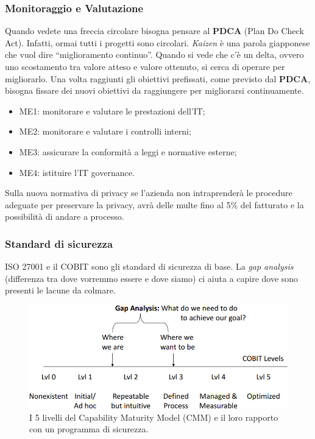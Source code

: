 \subsubsection{Monitoraggio e Valutazione}
Quando vedete una freccia circolare bisogna pensare al \textbf{PDCA} (Plan Do
Check Act). Infatti, ormai tutti i progetti sono circolari. \emph{Kaizen} è
una parola giapponese che vuol dire “miglioramento continuo”. Quando si vede
che c’è un delta, ovvero uno scostamento tra valore atteso e valore ottenuto,
si cerca di operare per migliorarlo. Una volta raggiunti gli obiettivi
prefissati, come previsto dal \textbf{PDCA}, bisogna fissare dei nuovi
obiettivi da raggiungere per migliorarsi continuamente.

\begin{itemize}
\item ME1: monitorare e valutare le prestazioni dell'IT;
\item ME2: monitorare e valutare i controlli interni;
\item ME3: assicurare la conformità a leggi e normative esterne;
\item ME4: istituire l'IT governance.
\end{itemize}

Sulla nuova normativa di privacy se l'azienda non intraprenderà le procedure
adeguate per preservare la privacy, avrà delle multe fino al 5\% del fatturato
e la possibilità di andare a processo.

\subsubsection{Standard di sicurezza}

ISO 27001 e il COBIT sono gli standard di sicurezza di base. La \textit{gap
analysis} (differenza tra dove vorremmo essere e dove siamo) ci aiuta a capire
dove sono presenti le lacune da colmare.

\begin{figure}[h!]
        \begin{center}
                \includegraphics[scale=2.0]{res/img/security_standard}
        \end{center}
        \caption{I 5 livelli del Capability Maturity Model (CMM) e il
        loro rapporto con un programma di sicurezza.}
\end{figure}


